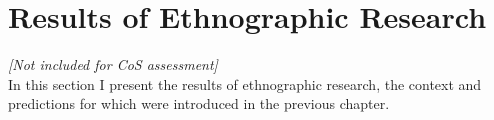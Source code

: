 \chapter{\label{ethnographyResults}Results of Ethnographic Research}

\textit{[Not included for CoS assessment]} \\
In this section I present the results of ethnographic research, the context and predictions for which were introduced in the previous chapter.









